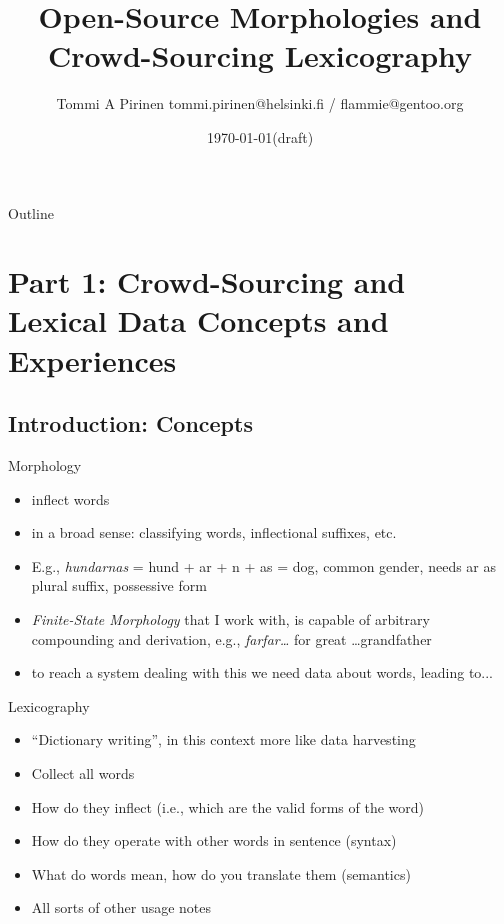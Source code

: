 \documentclass[t,12pt]{beamer}
\title[Open- and Crowd-sourced Lexicography]{Open-Source Morphologies and Crowd-Sourcing Lexicography}
\author[Tommi A Pirinen]{Tommi A Pirinen \scriptsize \guilsinglleft{}tommi.pirinen@helsinki.fi\guilsinglright{} / \guilsinglleft{}flammie@gentoo.org\guilsinglright{}}
\institute[University of Helsinki]{Department of Speech Sciences\\University of Helsinki}
\date{\today (draft)}
\begin{document}

\HyTitle

\begin{frame}{Outline}
    \tableofcontents
\end{frame}

\section{Part 1: Crowd-Sourcing and Lexical Data Concepts and Experiences}

\subsection{Introduction: Concepts}

\begin{frame}{Morphology}
    \begin{itemize}
        \item inflect words
        \item in a broad sense: classifying words, inflectional suffixes, etc.
        \item E.g., \emph{hundarnas} = hund + ar + n + as = dog, common gender,
            needs ar as plural suffix, possessive form
        \item \emph{Finite-State Morphology} that I work with, is capable of
            arbitrary compounding and derivation, e.g., \emph{farfar\ldots} for
            great \ldots grandfather
        \item to reach a system dealing with this we need data about
            words, leading to...
    \end{itemize}
\end{frame}

\begin{frame}{Lexicography}
    \begin{itemize}
        \item ``Dictionary writing'', in this context more like data harvesting
        \item Collect all words
        \item How do they inflect (i.e., which are the valid forms of the word)
        \item How do they operate with other words in sentence (syntax)
        \item What do words mean, how do you translate them (semantics)
        \item All sorts of other usage notes
    \end{itemize}
\end{frame}
\end{document}
